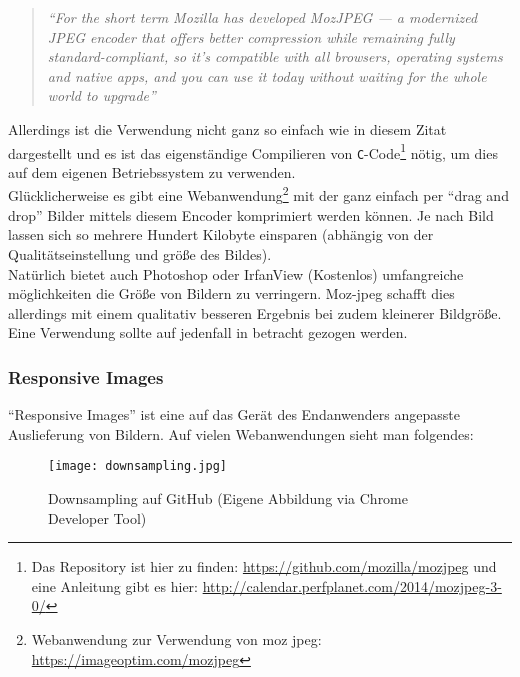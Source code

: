 			\begin{quote}
				\textit{"`For the short term Mozilla has developed MozJPEG — a modernized JPEG encoder that offers better compression while remaining fully standard-compliant, so it’s compatible with all browsers, operating systems and native apps, and you can use it today without waiting for the whole world to upgrade"'\autocite{mozJPEG}}
			\end{quote}

			Allerdings ist die Verwendung nicht ganz so einfach wie in diesem Zitat dargestellt und es ist das eigenständige Compilieren von \texttt{C}-Code\footnote{Das Repository ist hier zu finden: \url{https://github.com/mozilla/mozjpeg} und eine Anleitung gibt es hier: \url{http://calendar.perfplanet.com/2014/mozjpeg-3-0/}} nötig, um dies auf dem eigenen Betriebssystem zu verwenden.\\
			Glücklicherweise es gibt eine Webanwendung\footnote{Webanwendung zur Verwendung von moz jpeg: \url{https://imageoptim.com/mozjpeg}} mit der ganz einfach per "`drag and drop"' Bilder mittels diesem Encoder komprimiert werden können. Je nach Bild lassen sich so mehrere Hundert Kilobyte einsparen (abhängig von der Qualitätseinstellung und größe des Bildes).\\

			Natürlich bietet auch Photoshop oder IrfanView (Kostenlos) umfangreiche möglichkeiten die Größe von Bildern zu verringern. Moz-jpeg schafft dies allerdings mit einem qualitativ besseren Ergebnis bei zudem kleinerer Bildgröße. Eine Verwendung sollte auf jedenfall in betracht gezogen werden.


		\subsubsection{Responsive Images} %
		\label{ssub:responsive_images}
			"`Responsive Images"' ist eine auf das Gerät des Endanwenders angepasste Auslieferung von Bildern. Auf vielen Webanwendungen sieht man folgendes:

			\begin{figure}[htbp]
				\begin{center}
					\texttt{[image: downsampling.jpg]}
					\caption{Downsampling auf GitHub (Eigene Abbildung via Chrome Developer Tool)}
					\label{fig:downsampling}
				\end{center}
			\end{figure}

